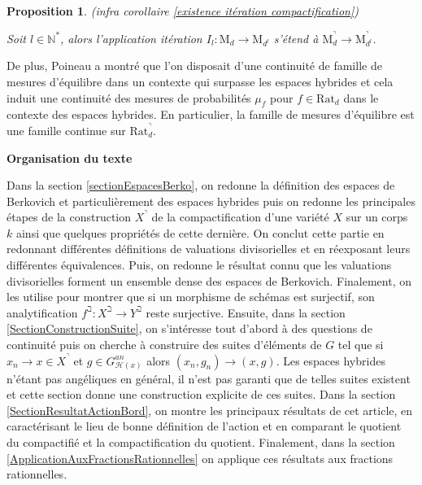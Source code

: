 \documentclass[11pt]{article}
\newcommand{\N}{\mathbb{N}}
\newcommand{\Rat}{\mathrm{Rat}}
\newcommand{\M}{\mathrm{M}}
\newtheorem{prop}[thm]{Proposition}
\begin{document}
\begin{prop}(infra corollaire \ref{existence itération compactification})

Soit $l \in \N^*$, alors l'application itération $I_l : \M_d \rightarrow \M_{d^l}$ s'étend à $\M_d^\urcorner \rightarrow \M_{d^l}^\urcorner$. 
\end{prop}

De plus, Poineau \cite{PoineauDynamique} a montré que l'on disposait d'une continuité de famille de mesures d'équilibre dans un contexte qui surpasse les espaces hybrides et cela induit une continuité des mesures de probabilités $\mu_f$ pour $f \in \Rat_d$ dans le contexte des espaces hybrides. En particulier, la famille de mesures d'équilibre est une famille continue sur $\Rat_d^\urcorner$. 

\begin{center}
\textbf{Organisation du texte}
\end{center}

Dans la section \ref{sectionEspacesBerko}, on redonne la définition des espaces de Berkovich et particulièrement des espaces hybrides puis on redonne les principales étapes de la construction $X^\urcorner$ de la compactification d'une variété $X$ sur un corps $k$ ainsi que quelques propriétés de cette dernière. On conclut cette partie en redonnant différentes définitions de valuations divisorielles et en réexposant leurs différentes équivalences. Puis, on redonne le résultat connu que les valuations divisorielles forment un ensemble dense des espaces de Berkovich. Finalement, on les utilise pour montrer que si un morphisme de schémas est surjectif, son analytification $f^\beth : X^\beth \rightarrow Y^\beth$ reste surjective. Ensuite, dans la section \ref{SectionConstructionSuite}, on s'intéresse tout d'abord à des questions de continuité puis on cherche à construire des suites d'éléments de $G$ tel que si $x_n \rightarrow x \in X^\urcorner$ et $g\in G^{an}_{\mathcal{H}(x)}$ alors $(x_n, g_n) \rightarrow (x,g)$. Les espaces hybrides n'étant pas angéliques en général, il n'est pas garanti que de telles suites existent et cette section donne une construction explicite de ces suites. Dans la section \ref{SectionResultatActionBord}, on montre les principaux résultats de cet article, en caractérisant le lieu de bonne définition de l'action et en comparant le quotient du compactifié et la compactification du quotient. Finalement, dans la section \ref{ApplicationAuxFractionsRationnelles} on applique ces résultats aux fractions rationnelles.
\end{document}
